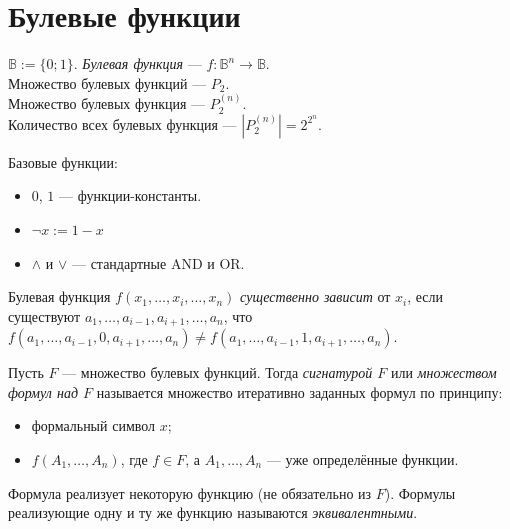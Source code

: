 \documentclass[12pt,a4paper]{article}
\date{}
\newcommand{\BB}[1][]{\ensuremath{\mathbb{B}#1}\xspace}
\begin{document}
    \maketitle

    \listoftodos[TODOs]

    \tableofcontents

    \section{Булевые функции}

    \begin{definition}
        $\BB := \{0; 1\}$. \emph{Булевая функция} --- $f: \BB^n \to \BB$.\\
        Множество булевых функций --- $P_2$.\\
        Множество булевых функция --- $P^{(n)}_2$.\\
        Количество всех булевых функция --- $\left|P^{(n)}_2\right|=2^{2^n}$.
    \end{definition}

    \begin{definition}
        Базовые функции:
        \begin{itemize}
            \item $0$, $1$ --- функции-константы.
            \item $\neg x := 1-x$
            \item $\wedge$ и $\vee$ --- стандартные AND и OR. 
        \end{itemize}
    \end{definition}

    \begin{definition}
        Булевая функция $f(x_1, \dots, x_i, \dots, x_n)$ \emph{существенно зависит} от $x_i$, если существуют $a_1, \dots, a_{i-1}, a_{i+1}, \dots, a_n$, что $f(a_1, \dots, a_{i-1}, 0, a_{i+1}, \dots, a_n) \neq f(a_1, \dots, a_{i-1}, 1, a_{i+1}, \dots, a_n)$.
    \end{definition}

    \begin{definition}
        Пусть $F$ --- множество булевых функций. Тогда \emph{сигнатурой $F$} или \emph{множеством формул над $F$} называется множество итеративно заданных формул по принципу:
        \begin{itemize}
            \item формальный символ $x$;
            \item $f(A_1, \dots, A_n)$, где $f\in F$, а $A_1, \dots, A_n$ --- уже определённые функции.
        \end{itemize}

        Формула реализует некоторую функцию (не обязательно из $F$). Формулы реализующие одну и ту же функцию называются \emph{эквивалентными}.
    \end{definition}
\end{document}

